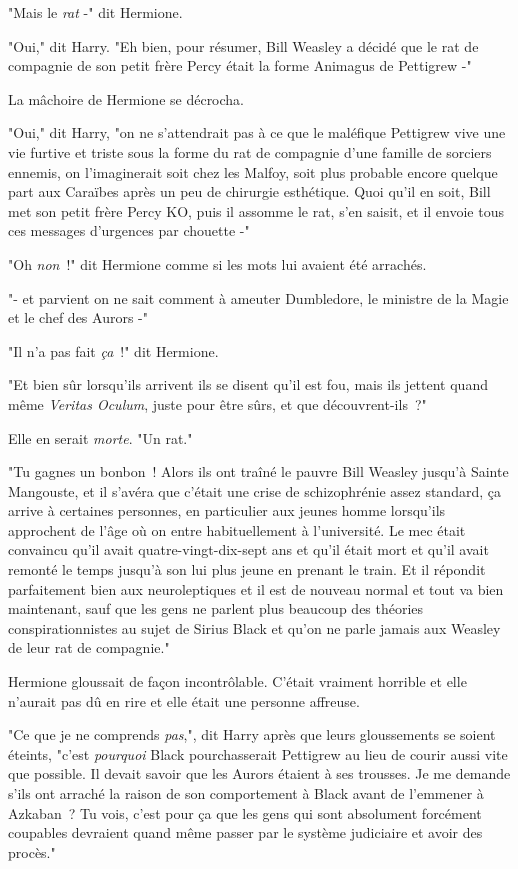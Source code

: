 "Mais le \emph{rat} -" dit Hermione.

"Oui," dit Harry. "Eh bien, pour résumer, Bill Weasley a décidé que le rat de compagnie de son petit frère Percy était la forme Animagus de Pettigrew -"

La mâchoire de Hermione se décrocha.

"Oui," dit Harry, "on ne s'attendrait pas à ce que le maléfique Pettigrew vive une vie furtive et triste sous la forme du rat de compagnie d'une famille de sorciers ennemis, on l'imaginerait soit chez les Malfoy, soit plus probable encore quelque part aux Caraïbes après un peu de chirurgie esthétique. Quoi qu'il en soit, Bill met son petit frère Percy KO, puis il assomme le rat, s'en saisit, et il envoie tous ces messages d'urgences par chouette -"

"Oh \emph{non}~!" dit Hermione comme si les mots lui avaient été arrachés.

"- et parvient on ne sait comment à ameuter Dumbledore, le ministre de la Magie et le chef des Aurors -"

"Il n'a pas fait \emph{ça}~!" dit Hermione.

"Et bien sûr lorsqu'ils arrivent ils se disent qu'il est fou, mais ils jettent quand même \emph{Veritas Oculum}, juste pour être sûrs, et que découvrent-ils~?"

Elle en serait \emph{morte}. "Un rat."

"Tu gagnes un bonbon~! Alors ils ont traîné le pauvre Bill Weasley jusqu'à Sainte Mangouste, et il s'avéra que c'était une crise de schizophrénie assez standard, ça arrive à certaines personnes, en particulier aux jeunes homme lorsqu'ils approchent de l'âge où on entre habituellement à l'université. Le mec était convaincu qu'il avait quatre-vingt-dix-sept ans et qu'il était mort et qu'il avait remonté le temps jusqu'à son lui plus jeune en prenant le train. Et il répondit parfaitement bien aux neuroleptiques et il est de nouveau normal et tout va bien maintenant, sauf que les gens ne parlent plus beaucoup des théories conspirationnistes au sujet de Sirius Black et qu'on ne parle jamais aux Weasley de leur rat de compagnie."

Hermione gloussait de façon incontrôlable. C'était vraiment horrible et elle n'aurait pas dû en rire et elle était une personne affreuse.

"Ce que je ne comprends \emph{pas},", dit Harry après que leurs gloussements se soient éteints, "c'est \emph{pourquoi} Black pourchasserait Pettigrew au lieu de courir aussi vite que possible. Il devait savoir que les Aurors étaient à ses trousses. Je me demande s'ils ont arraché la raison de son comportement à Black avant de l'emmener à Azkaban~? Tu vois, c'est pour ça que les gens qui sont absolument forcément coupables devraient quand même passer par le système judiciaire et avoir des procès."

